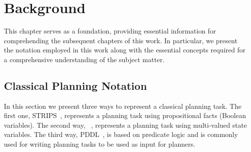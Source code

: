 \documentclass[ppgc,diss,english]{iiufrgs}
\begin{document}
\chapter{Background}
\label{cha:background}
This chapter serves as a foundation, providing essential information for comprehending the subsequent chapters of this work. In particular, we present the notation employed in this work along with the essential concepts required for a comprehensive understanding of the subject matter.

\section{Classical Planning Notation}
\label{sec:background-planning-notation}
In this section we present three ways to represent a classical planning task. The first one, STRIPS~\cite{Fikes.Nilsson/1971}, represents a planning task using propositional facts (Boolean variables). The second way, \sas~\cite{Backstrom.Nebel/1995}, represents a planning task using multi-valued state variables. The third way, PDDL~\cite{Ghallab.etal/1998}, is based on predicate logic and is commonly used for writing planning tasks to be used as input for planners.
\end{document}
